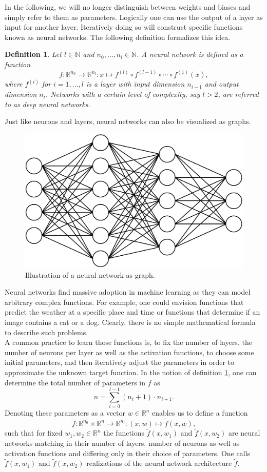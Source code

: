 \documentclass[11pt, a4paper]{article}
\newtheorem{definition}[theorem]{Definition}
\newcommand{\N}{\mathbb{N}}
\newcommand{\R}{\mathbb{R}}
\begin{document}
In the following, we will no longer distinguish between weights and biases and simply refer to them as parameters. Logically one can use the output of a layer as input for another layer. Iteratively doing so will construct specific functions known as neural networks. The following definition formalizes this idea. \\

\begin{definition} \label{def:network}
Let $l \in \N$ and $n_0, \dots, n_l \in \N$. A neural network is defined as a function
\[ f : \R^{n_0} \to \R^{n_l} : x \mapsto f^{(l)} \circ f^{(l-1)} \circ \cdots \circ f^{(1)} (x),\]
where $f^{(i)}$ for $i=1, \dots, l$ is a layer with input dimension $n_{i-1}$ and output dimension $n_i$. Networks with a certain level of complexity, say $l>2$, are referred to as deep neural networks.
\end{definition}

Just like neurons and layers, neural networks can also be visualized as graphs.

\begin{figure}[!h]
\centering
\includegraphics[width=0.6\linewidth]{images/network.png}
\caption{Illustration of a neural network as graph.}
\label{fig:neuron}
\end{figure}  

Neural networks find massive adoption in machine learning as they can model arbitrary complex functions. For example, one could envision functions that predict the weather at a specific place and time or functions that determine if an image contains a cat or a dog. Clearly, there is no simple mathematical formula to describe such problems. \\

A common practice to learn those functions is, to fix the number of layers, the number of neurons per layer as well as the activation functions, to choose some initial parameters, and then iteratively adjust the parameters in order to approximate the unknown target function. In the notion of definition \ref{def:network}, one can determine the total number of parameters in $f$ as
\[ n = \sum_{i=0}^{l-1} (n_i + 1) \cdot n_{i+1}. \]
Denoting these parameters as a vector $w \in \R^n$ enables us to define a function
\[ \tilde{f} : \R^{n_0} \times \R^n \to \R^{n_l} : (x,w) \mapsto \tilde{f}(x,w), \]
such that for fixed $w_1, w_2 \in \R^n$ the functions $\tilde{f}(x,w_1)$ and $\tilde{f}(x,w_2)$ are neural networks matching in their number of layers, number of neurons as well as activation functions and differing only in their choice of parameters. One calls $\tilde{f}(x,w_1)$ and $\tilde{f}(x,w_2)$ realizations of the neural network architecture $\tilde{f}$. \\
\end{document}
